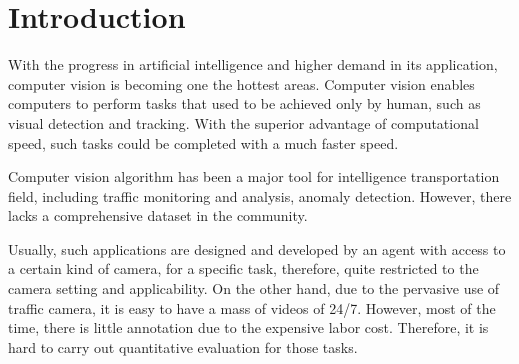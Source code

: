 \section{Introduction}

With the progress in artificial intelligence and higher demand in its application, computer vision is becoming one the hottest areas. 
Computer vision enables computers to perform tasks that used to be achieved only by human, such as visual detection and tracking. 
With the superior advantage of computational speed, such tasks could be completed with a much faster speed.

Computer vision algorithm has been a major tool for intelligence transportation field, including traffic monitoring and analysis, anomaly detection. 
However, there lacks a comprehensive dataset in the community.

Usually, such applications are designed and developed by an agent with access to a certain kind of camera, for a specific task, therefore, quite restricted to the camera setting and applicability.
On the other hand, due to the pervasive use of traffic camera, it is easy to have a mass of videos of 24/7. However, most of the time, there is little annotation due to the expensive labor cost. 
Therefore, it is hard to carry out quantitative evaluation for those tasks.
